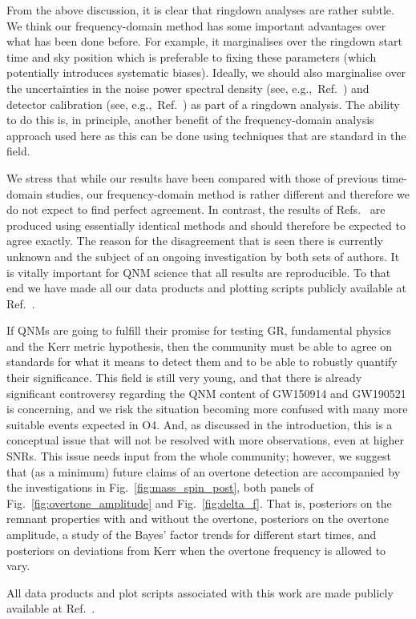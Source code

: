 From the above discussion, it is clear that ringdown analyses are rather subtle. 
We think our frequency-domain method has some important advantages over what has been done before. 
For example, it marginalises over the ringdown start time and sky position which is preferable to fixing these parameters (which potentially introduces systematic biases). 
Ideally, we should also marginalise over the uncertainties in the noise power spectral density (see, e.g.,\ Ref.~\cite{Cornish:2020dwh}) and detector calibration (see, e.g.,\ Ref.~\cite{LIGOScientific:2017aaj}) as part of a ringdown analysis. 
The ability to do this is, in principle, another benefit of the frequency-domain analysis approach used here as this can be done using techniques that are standard in the field.

We stress that while our results have been compared with those of previous time-domain studies, our frequency-domain method is rather different and therefore we do not expect to find perfect agreement. 
In contrast, the results of Refs.~\cite{Isi:2019aib, Cotesta:2022pci, Isi:2022mhy} are produced using essentially identical methods and should therefore be expected to agree exactly. 
The reason for the disagreement that is seen there is currently unknown and the subject of an ongoing investigation by both sets of authors.
It is vitally important for QNM science that all results are reproducible. To that end we have made all our data products and plotting scripts publicly available at Ref.~\cite{finch_eliot_2022_6949492}.

If QNMs are going to fulfill their promise for testing GR, fundamental physics and the Kerr metric hypothesis, then the community must be able to agree on standards for what it means to detect them and to be able to robustly quantify their significance. 
This field is still very young, and that there is already significant controversy regarding the QNM content of GW150914 and GW190521 is concerning, and we risk the situation becoming more confused with many more suitable events expected in O4.
And, as discussed in the introduction, this is a conceptual issue that will not be resolved with more observations, even at higher SNRs.
This issue needs input from the whole community; however, we suggest that (as a minimum) future claims of an overtone detection are accompanied by the investigations in Fig.~\ref{fig:mass_spin_post}, both panels of Fig.~\ref{fig:overtone_amplitude} and Fig.~\ref{fig:delta_f}.
That is, posteriors on the remnant properties with and without the overtone, posteriors on the overtone amplitude, a study of the Bayes' factor trends for different start times, and posteriors on deviations from Kerr when the overtone frequency is allowed to vary.

All data products and plot scripts associated with this work are made publicly available at Ref.~\cite{finch_eliot_2022_6949492}.
